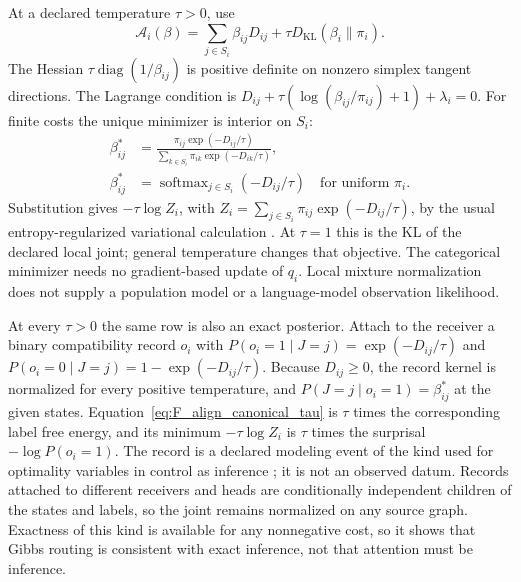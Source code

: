 \documentclass[twoside,11pt]{article}
\begin{document}
At a declared temperature $\tau>0$, use
\begin{equation}
\mathcal A_i(\beta)=\sum_{j\in S_i}\beta_{ij}D_{ij}
+\tau D_{\mathrm{KL}}(\beta_i\|\pi_i).
\label{eq:F_align_canonical_tau}
\end{equation}
The Hessian $\tau\operatorname{diag}(1/\beta_{ij})$ is positive definite on nonzero simplex tangent directions. The Lagrange condition is
$D_{ij}+\tau(\log(\beta_{ij}/\pi_{ij})+1)+\lambda_i=0$.
For finite costs the unique minimizer is interior on $S_i$:
\begin{align}
\beta_{ij}^*&=\frac{\pi_{ij}\exp(-D_{ij}/\tau)}
{\sum_{k\in S_i}\pi_{ik}\exp(-D_{ik}/\tau)},
\label{eq:mixture_softmax_general}\\
\beta_{ij}^*&=\operatorname{softmax}_{j\in S_i}(-D_{ij}/\tau)
\quad\text{for uniform }\pi_i.
\label{eq:mixture_softmax}
\end{align}
Substitution gives $-\tau\log Z_i$, with
$Z_i=\sum_{j\in S_i}\pi_{ij}\exp(-D_{ij}/\tau)$, by the usual entropy-regularized variational calculation \citep{Boyd2004,Wainwright2008,Niculae2017Regularized}.
At $\tau=1$ this is the KL of the declared local joint; general temperature changes that objective. The categorical minimizer needs no gradient-based update of $q_i$. Local mixture normalization does not supply a population model or a language-model observation likelihood.

At every $\tau>0$ the same row is also an exact posterior. Attach to the receiver a binary compatibility record $o_i$ with $P(o_i=1\mid J=j)=\exp(-D_{ij}/\tau)$ and $P(o_i=0\mid J=j)=1-\exp(-D_{ij}/\tau)$. Because $D_{ij}\ge0$, the record kernel is normalized for every positive temperature, and $P(J=j\mid o_i=1)=\beta_{ij}^*$ at the given states. Equation~\eqref{eq:F_align_canonical_tau} is $\tau$ times the corresponding label free energy, and its minimum $-\tau\log Z_i$ is $\tau$ times the surprisal $-\log P(o_i=1)$. The record is a declared modeling event of the kind used for optimality variables in control as inference \citep{ToussaintStorkey2006,Kappen2012,Levine2018}; it is not an observed datum. Records attached to different receivers and heads are conditionally independent children of the states and labels, so the joint remains normalized on any source graph. Exactness of this kind is available for any nonnegative cost, so it shows that Gibbs routing is consistent with exact inference, not that attention must be inference.
\end{document}
